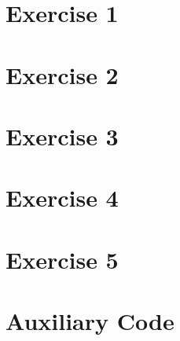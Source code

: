 \documentclass[a4paper,11pt]{article}
\begin{document}


\section{Exercise 1}


\section{Exercise 2}


\section{Exercise 3}


\section{Exercise 4}


\section{Exercise 5}


\section{Auxiliary Code}

\end{document}
